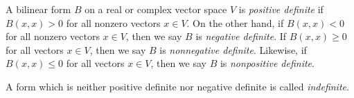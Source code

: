 \documentclass{article}
\begin{document}
A bilinear form $B$ on a real or complex vector space $V$ is {\em positive definite} if $B(x,x) > 0$ for all nonzero vectors $x \in V$. On the other hand, if $B(x,x) < 0$ for all nonzero vectors $x \in V$, then we say $B$ is {\em negative definite}. If $B(x,x) \ge 0$ for all vectors $x \in V$, then we say 
   $B$ is {\em nonnegative definite}. Likewise, 
if $B(x,x) \le 0$ for all vectors $x \in V$, then we say 
   $B$ is {\em nonpositive definite}.

A form which is neither positive definite nor negative definite is called {\em indefinite}.
\end{document}
